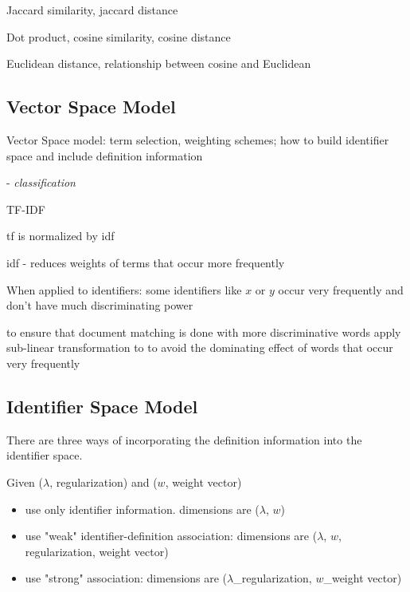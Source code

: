 Jaccard similarity, jaccard distance 

Dot product, cosine similarity, cosine distance 

Euclidean distance, relationship between cosine and Euclidean 



\subsection{Vector Space Model}

Vector Space model: term selection, weighting schemes; how to build identifier space and include definition information

\cite{sebastiani2002machine} - \emph{classification}



TF-IDF


tf is normalized by idf

idf - reduces weights of terms that occur more frequently

When applied to identifiers: some identifiers like $x$ or $y$ occur very frequently and don't have much discriminating power


to ensure that document matching is done with more discriminative words
apply sub-linear transformation to to avoid the dominating effect of words that occur very frequently


\subsection{Identifier Space Model}


There are three ways of incorporating the definition information into the identifier space.

Given ($\lambda$, regularization) and ($w$, weight vector)

\begin{itemize}
  \item use only identifier information. dimensions are ($\lambda$, $w$)
  \item use "weak" identifier-definition association:  dimensions are ($\lambda$, $w$, regularization, weight vector)
  \item use "strong" association:  dimensions are ($\lambda$\_regularization, $w$\_weight vector)
\end{itemize}


